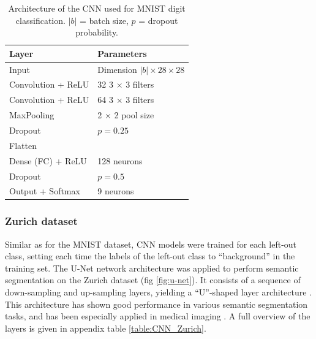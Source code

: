 \documentclass[10pt]{article}
\begin{document}
\begin{table}[H]
    \begin{center}
    \begin{tabular}{ll}
    \toprule
    Layer & Parameters \\
    \hline
    Input & Dimension $|b| \times 28 \times 28$ \\ 
    Convolution + \gls{ReLU} & 32 3 $\times$ 3 filters\\
    Convolution + \gls{ReLU} & 64 3 $\times$ 3 filters\\
    MaxPooling & 2 $\times$ 2 pool size \\
    Dropout & $p = 0.25$ \\
    \hline
    Flatten & \\
    Dense (\gls{FC}) + \gls{ReLU} & 128 neurons\\
    Dropout & $p = 0.5$ \\
    Output + Softmax & 9 neurons \\
    \bottomrule
    \end{tabular}
    \caption{Architecture of the \gls{CNN} used for \gls{MNIST} digit classification. $|b|$ = batch size, $p$ = dropout probability.}
    \label{table:CNN_MNIST}
    \end{center}
\end{table}

\subsubsection{Zurich dataset} Similar as for the \gls{MNIST} dataset, \gls{CNN} models were trained for each left-out class, setting each time the labels of the left-out class to ``background'' in the training set. The U-Net network architecture was applied to perform semantic segmentation on the Zurich dataset (fig \ref{fig:u-net}). It consists of a sequence of down-sampling and up-sampling layers, yielding a ``U''-shaped layer architecture \cite{ronneberger2015u}. This architecture has shown good performance in various semantic segmentation tasks, and has been especially applied in medical imaging \cite{ronneberger2015u, Alom2018RecurrentRC, Dong2017AutomaticBT}. A full overview of the layers is given in appendix table  \ref{table:CNN_Zurich}.
\end{document}
